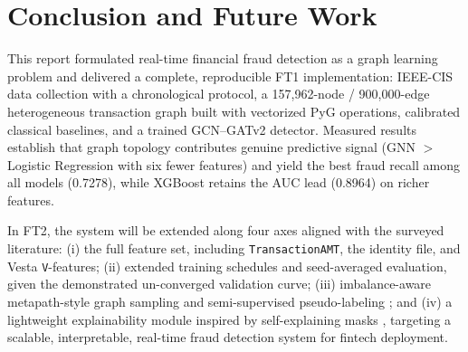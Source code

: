 \documentclass[conference]{IEEEtran}
\begin{document}
\section{Conclusion and Future Work}
This report formulated real-time financial fraud detection as a graph
learning problem and delivered a complete, reproducible FT1
implementation: IEEE-CIS data collection with a chronological protocol, a
157{,}962-node / 900{,}000-edge heterogeneous transaction graph built with
vectorized PyG operations, calibrated classical baselines, and a trained
GCN--GATv2 detector. Measured results establish that graph topology
contributes genuine predictive signal (GNN $>$ Logistic Regression with
six fewer features) and yield the best fraud recall among all models
(0.7278), while XGBoost retains the AUC lead (0.8964) on richer features.

In FT2, the system will be extended along four axes aligned with the
surveyed literature: (i) the full feature set, including
\texttt{TransactionAMT}, the identity file, and Vesta \texttt{V}-features;
(ii) extended training schedules and seed-averaged evaluation, given the
demonstrated un-converged validation curve; (iii) imbalance-aware
metapath-style graph sampling and semi-supervised pseudo-labeling
\cite{qian2025metapath,wang2026cosemignn}; and (iv) a lightweight
explainability module inspired by self-explaining masks
\cite{li2024sefraud}, targeting a scalable, interpretable, real-time fraud
detection system for fintech deployment.
\end{document}
